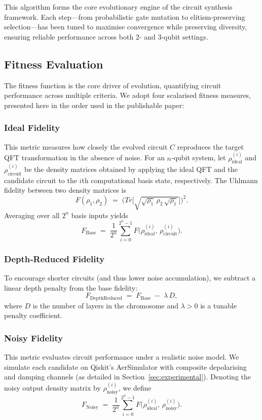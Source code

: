 \documentclass[11pt,a4paper]{article}
\begin{document}
This algorithm forms the core evolutionary engine of the circuit synthesis framework. Each step—from probabilistic gate mutation to elitism-preserving selection—has been tuned to maximise convergence while preserving diversity, ensuring reliable performance across both 2- and 3-qubit settings.

\subsection{Fitness Evaluation}
The fitness function is the core driver of evolution, quantifying circuit performance across multiple criteria.  We adopt four scalarised fitness measures, presented here in the order used in the publishable paper:

\subsubsection*{Ideal Fidelity}

This metric measures how closely the evolved circuit $C$ reproduces the target QFT transformation in the absence of noise.  For an $n$‐qubit system, let $\rho_{\mathrm{ideal}}^{(i)}$ and $\rho_{\mathrm{circuit}}^{(i)}$ be the density matrices obtained by applying the ideal QFT and the candidate circuit to the $i$th computational basis state, respectively.  The Uhlmann fidelity between two density matrices is
\[
F(\rho_1,\rho_2)\;=\;\bigl(Tr\bigl[\sqrt{\sqrt{\rho_1}\,\rho_2\,\sqrt{\rho_1}}\bigr]\bigr)^2.
\]
Averaging over all $2^n$ basis inputs yields
\begin{equation}
  F_{\mathrm{Base}}
  \;=\;\frac{1}{2^n}\sum_{i=0}^{2^n-1}
    F\bigl(\rho_{\mathrm{ideal}}^{(i)},\,\rho_{\mathrm{circuit}}^{(i)}\bigr).
\end{equation}

\subsubsection*{Depth‐Reduced Fidelity}
To encourage shorter circuits (and thus lower noise accumulation), we subtract a linear depth penalty from the base fidelity:
\begin{equation}
  F_{\mathrm{DepthReduced}}
  \;=\;F_{\mathrm{Base}}\;-\;\lambda\,D,
\end{equation}
where $D$ is the number of layers in the chromosome and $\lambda>0$ is a tunable penalty coefficient.

\subsubsection*{Noisy Fidelity}
This metric evaluates circuit performance under a realistic noise model.  We simulate each candidate on Qiskit’s AerSimulator with composite depolarising and damping channels (as detailed in Section~\ref{sec:experimental}).  Denoting the noisy output density matrix by $\rho_{\mathrm{noisy}}^{(i)}$, we define
\begin{equation}
  F_{\mathrm{Noisy}}
  \;=\;\frac{1}{2^n}\sum_{i=0}^{2^n-1}
    F\bigl(\rho_{\mathrm{ideal}}^{(i)},\,\rho_{\mathrm{noisy}}^{(i)}\bigr).
\end{equation}
\end{document}
